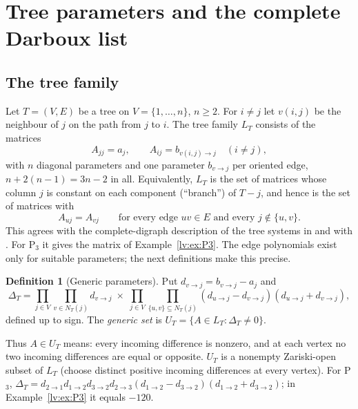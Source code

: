 \documentclass[11pt,a4paper]{article}
\theoremstyle{definition}
\newtheorem{definition}[theorem]{Definition}
\theoremstyle{remark}
\begin{document}
\section{Tree parameters and the complete Darboux list}
\label{lv:sec:parameters}

\subsection{The tree family}

Let $T=(V,E)$ be a tree on $V=\{1,\dots,n\}$, $n\geq2$. For $i\neq j$ let $v(i,j)$ be the neighbour of $j$ on the path from $j$ to $i$. The tree family $L_T$ consists of the matrices
\begin{equation}
  A_{jj}=a_j,
  \qquad
  A_{ij}=b_{v(i,j)\to j}\quad(i\ne j),
  \label{lv:eq:tree-matrix}
\end{equation}
with $n$ diagonal parameters and one parameter $b_{v\to j}$ per oriented edge, $n+2(n-1)=3n-2$ in all. Equivalently, $L_T$ is the set of matrices whose column $j$ is constant on each component (``branch'') of $T-j$, and hence is the set of matrices with
\begin{equation}
 A_{uj}=A_{vj}\qquad\text{for every edge }uv\in E\text{ and every }j\notin\{u,v\}.
 \label{lv:eq:LT-equations}
\end{equation}
This agrees with the complete-digraph description of the tree systems in \cite[\S2, Definitions~3 and~5]{lv:KQM2024} and with \cite[\S5]{lv:QTMK2023}. For P$_3$ it gives the matrix of Example~\ref{lv:ex:P3}. The edge polynomials exist only for suitable parameters; the next definitions make this precise.

\begin{definition}[Generic parameters]
\label{lv:def:UT}
Put $d_{v\to j}=b_{v\to j}-a_j$ and
\begin{equation}
  \Delta_T=
  \prod_{j\in V}\prod_{v\in N_T(j)}d_{v\to j}
  \;\times\;
  \prod_{j\in V}
  \prod_{\{u,v\}\subseteq N_T(j)}
  (d_{u\to j}-d_{v\to j})(d_{u\to j}+d_{v\to j}),
\label{lv:eq:delta}
\end{equation}
defined up to sign. The \emph{generic set} is $U_T=\{A\in L_T:\Delta_T\neq0\}$.
\end{definition}

Thus $A\in U_T$ means: every incoming difference is nonzero, and at each vertex no two incoming differences are equal or opposite. $U_T$ is a nonempty Zariski-open subset of $L_T$ (choose distinct positive incoming differences at every vertex). For P$_3$, $\Delta_T=d_{2\to1}d_{1\to2}d_{3\to2}d_{2\to3}(d_{1\to2}-d_{3\to2})(d_{1\to2}+d_{3\to2})$; in Example~\ref{lv:ex:P3} it equals $-120$.
\end{document}
